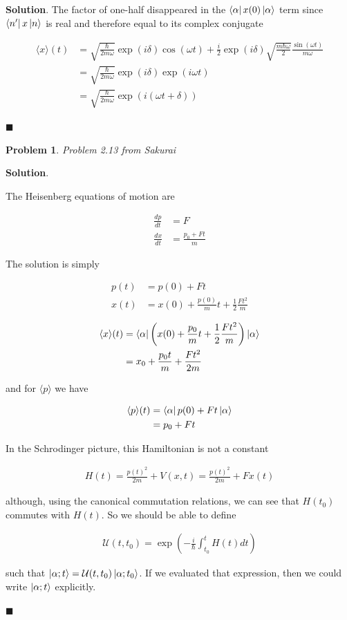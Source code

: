 \documentclass[12pt]{article}
\newtheorem{p}{Problem}
\theoremstyle{definition}
\newenvironment{s}{%
        \begin{trivlist} \item \textbf{Solution}. }{%
            \hspace*{\fill} $\blacksquare$\end{trivlist}}%
\begin{document}
{\begin{s}
The factor of one-half disappeared in the $\bra{\alpha}x(0)\ket{\alpha}$ term since $\bra{n'}x\ket{n}$ is real and therefore equal to its complex conjugate


\begin{align*}
\langle x \rangle (t) &= \sqrt{\frac{\hbar}{2m\omega}}\exp(i\delta)\cos(\omega t) + \frac{i}{2}\exp(i\delta)\sqrt{\frac{m\hbar\omega}{2}}\frac{\sin(\omega t)}{m\omega}\\
&= \sqrt{\frac{\hbar}{2m\omega}}\exp(i\delta)\exp(i\omega t)\\
&= \sqrt{\frac{\hbar}{2m\omega}}\exp(i(\omega t+\delta))
\end{align*}


\end{s}

\begin{p}
Problem 2.13 from Sakurai
\end{p}

\begin{s}

The Heisenberg equations of motion are

\begin{align*}
\frac{dp}{dt} &= F\\
\frac{dx}{dt} &= \frac{p_{0}+Ft}{m}
\end{align*}

The solution is simply

\begin{align*}
p(t) &= p(0) + Ft\\
x(t) &= x(0) + \frac{p(0)}{m}t + \frac{1}{2}\frac{Ft^{2}}{m}
\end{align*}

\begin{align*}
\langle x \rangle (t) &= \bra{\alpha} \left(x(0) + \frac{p_{0}}{m}t + \frac{1}{2}\frac{Ft^{2}}{m}\right)\ket{\alpha}\\
&= x_{0} + \frac{p_{0}t}{m} + \frac{Ft^{2}}{2m}
\end{align*}

and for $\langle p\rangle$ we have

\begin{align*}
\langle p \rangle (t) &= \bra{\alpha} p(0) + Ft\ket{\alpha}\\
&= p_{0} + Ft
\end{align*}

In the Schrodinger picture, this Hamiltonian is not a constant

\begin{align*}
H(t) = \frac{p(t)^{2}}{2m} + V(x,t) = \frac{p(t)^{2}}{2m} + Fx(t)
\end{align*}

although, using the canonical commutation relations, we can see that $H(t_{0})$ commutes with $H(t)$. So we should be able to define

\begin{align*}
\mathcal{U}(t,t_{0}) = \exp\left(-\frac{i}{\hbar}\int_{t_{0}}^{t} H(t)dt\right)
\end{align*}

such that $\ket{\alpha;t} = \mathcal{U}(t,t_{0}) \ket{\alpha;t_{0}}$. If we evaluated that expression, then we could write $\ket{\alpha;t}$ explicitly.

\end{s}
\end{document}
